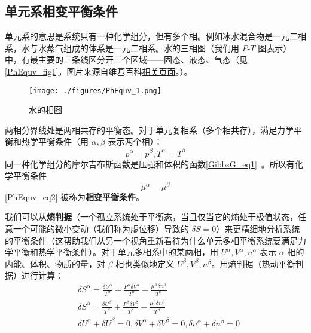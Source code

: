 \subsection{单元系相变平衡条件}
单元系的意思是系统只有一种化学组分，但有多个相。例如冰水混合物是一元二相系，水与水蒸气组成的体系是一元二相系。水的三相图（我们用 $P$-$T$ 图表示）中，有最主要的三条线区分开三个区域——固态、液态、气态（见\autoref{PhEquv_fig1}，图片来源自维基百科\href{https://en.wikipedia.org/wiki/Triple_point}{相关页面}。）。
\begin{figure}[ht]
\centering
\texttt{[image: ./figures/PhEquv\_1.png]}
\caption{水的相图} \label{PhEquv_fig1}
\end{figure}

两相分界线处是两相共存的平衡态。对于单元复相系（多个相共存），满足力学平衡和热学平衡条件（用 $\alpha,\beta$ 表示两个相）：
\begin{equation}\label{PhEquv_eq1}
p^{\alpha}=p^{\beta}, 
T^{\alpha}=T^{\beta}
\end{equation}
同一种化学组分的摩尔吉布斯函数是压强和体积的函数\autoref{GibbsG_eq1}~。所以有化学平衡条件
\begin{equation}\label{PhEquv_eq2}
\mu^{\alpha}=\mu^\beta
\end{equation}
\autoref{PhEquv_eq2} 被称为\textbf{相变平衡条件}。

我们可以从\textbf{熵判据}（一个孤立系统处于平衡态，当且仅当它的熵处于极值状态，任意一个可能的微小变动（我们称为虚位移）导致的 $\delta S=0$）来更精细地分析系统的平衡条件（这帮助我们从另一个视角重新看待为什么单元多相平衡系统要满足力学平衡和热学平衡条件）。对于单元多相系中的某两相，用 $U^\alpha,V^\alpha,n^\alpha$ 表示 $\alpha$ 相的内能、体积、物质的量，对 $\beta$ 相也类似地定义 $U^\beta,V^\beta,n^\beta$。用熵判据（热动平衡判据）进行计算：
\begin{equation}
\begin{aligned}
&\delta S^\alpha=\frac{\delta U^\alpha}{T^\alpha}+\frac{P^\alpha\delta V^\alpha}{T^{\alpha}}-\frac{\mu^\alpha\delta n^\alpha}{T^{\alpha}}\\
&\delta S^\beta=\frac{\delta U^\beta}{T^\beta}+\frac{P^\beta\delta V^\beta}{T^{\beta}}-\frac{\mu^\beta\delta n^\beta}{T^{\beta}}\\
&\delta U^\alpha+\delta U^\beta=0,\delta V^\alpha+\delta V^\beta=0,\delta n^\alpha+\delta n^\beta=0
\end{aligned}
\end{equation}

